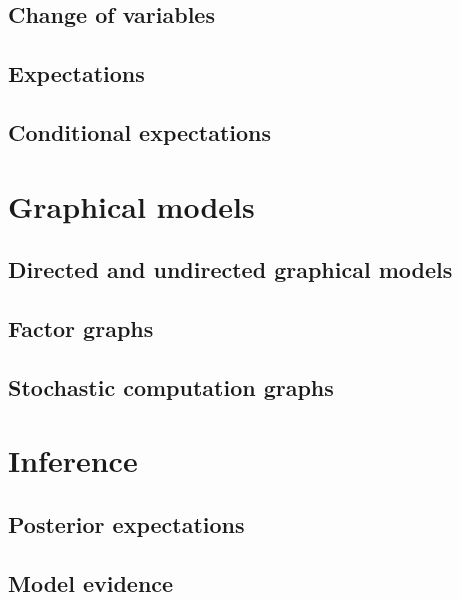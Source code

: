 \subsection{Change of variables}



\subsection{Expectations}

\subsection{Conditional expectations}

\section{Graphical models}


\subsection{Directed and undirected graphical models}

\subsection{Factor graphs}

\subsection{Stochastic computation graphs}

\section{Inference}


\subsection{Posterior expectations}

\subsection{Model evidence}


